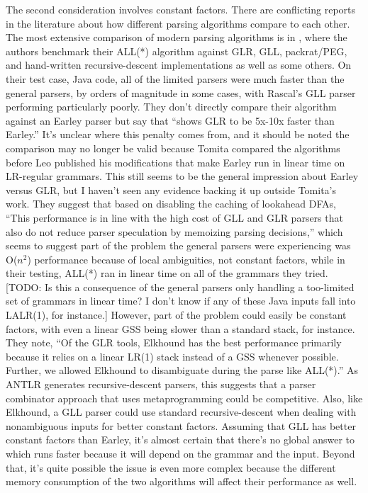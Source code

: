 \documentclass[12pt]{article}
\begin{document}
The second consideration involves constant factors.  There are
conflicting reports in the literature about how different parsing
algorithms compare to each other.  The most extensive comparison of
modern parsing algorithms is in \textcite{antlr4}, where the authors
benchmark their ALL(*) algorithm against GLR, GLL, packrat/PEG, and
hand-written recursive-descent implementations as well as some others.
On their test case, Java code, all of the limited parsers were much
faster than the general parsers, by orders of magnitude in some cases,
with Rascal's GLL parser performing particularly poorly.  They don't
directly compare their algorithm against an Earley parser but say that
\textcite{tomita1985efficient} ``shows GLR to be 5x-10x faster than
Earley.''  It's unclear where this penalty comes from, and it should
be noted the comparison may no longer be valid because Tomita compared
the algorithms before Leo published his modifications that make Earley
run in linear time on LR-regular grammars.  This still seems to be the
general impression about Earley versus GLR, but I haven't seen any
evidence backing it up outside Tomita's work.  They suggest that based
on disabling the caching of lookahead DFAs, ``This performance is in
line with the high cost of GLL and GLR parsers that also do not reduce
parser speculation by memoizing parsing decisions,'' which seems to
suggest part of the problem the general parsers were experiencing was
O($n^2$) performance because of local ambiguities, not constant
factors, while in their testing, ALL(*) ran in linear time on all of
the grammars they tried.  [TODO: Is this a consequence of the general
parsers only handling a too-limited set of grammars in linear time?  I
don't know if any of these Java inputs fall into LALR(1), for
instance.]  However, part of the problem could easily be constant
factors, with even a linear GSS being slower than a standard stack,
for instance.  They note, ``Of the GLR tools, Elkhound has the best
performance primarily because it relies on a linear LR(1) stack
instead of a GSS whenever possible.  Further, we allowed Elkhound to
disambiguate during the parse like ALL(*).''  As ANTLR generates
recursive-descent parsers, this suggests that a parser combinator
approach that uses metaprogramming could be competitive.  Also, like
Elkhound, a GLL parser could use standard recursive-descent when
dealing with nonambiguous inputs for better constant factors.
Assuming that GLL has better constant factors than Earley, it's almost
certain that there's no global answer to which runs faster because it
will depend on the grammar and the input.  Beyond that, it's quite
possible the issue is even more complex because the different memory
consumption of the two algorithms will affect their performance as
well.
\end{document}
